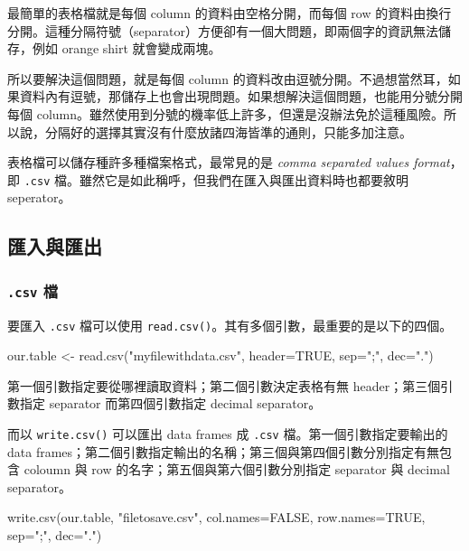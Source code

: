 \documentclass[
]{book}
\newenvironment{Shaded}{\begin{snugshade}}{\end{snugshade}}
\newcommand{\AttributeTok}[1]{\textcolor[rgb]{0.77,0.63,0.00}{#1}}
\newcommand{\ConstantTok}[1]{\textcolor[rgb]{0.00,0.00,0.00}{#1}}
\newcommand{\FunctionTok}[1]{\textcolor[rgb]{0.00,0.00,0.00}{#1}}
\newcommand{\NormalTok}[1]{#1}
\newcommand{\OtherTok}[1]{\textcolor[rgb]{0.56,0.35,0.01}{#1}}
\newcommand{\StringTok}[1]{\textcolor[rgb]{0.31,0.60,0.02}{#1}}
\theoremstyle{definition}
\theoremstyle{remark}
\begin{document}
最簡單的表格檔就是每個 column 的資料由空格分開，而每個 row 的資料由換行分開。這種分隔符號（separator）方便卻有一個大問題，即兩個字的資訊無法儲存，例如 orange shirt 就會變成兩塊。

所以要解決這個問題，就是每個 column 的資料改由逗號分開。不過想當然耳，如果資料內有逗號，那儲存上也會出現問題。如果想解決這個問題，也能用分號分開每個 column。雖然使用到分號的機率低上許多，但還是沒辦法免於這種風險。所以說，分隔好的選擇其實沒有什麼放諸四海皆準的通則，只能多加注意。

表格檔可以儲存種許多種檔案格式，最常見的是 \emph{comma separated values format}，即 \texttt{.csv} 檔。雖然它是如此稱呼，但我們在匯入與匯出資料時也都要敘明 seperator。

\hypertarget{ux532fux5165ux8207ux532fux51fa}{%
\subsection{匯入與匯出}\label{ux532fux5165ux8207ux532fux51fa}}

\hypertarget{csv-ux6a94}{%
\subsubsection{\texorpdfstring{\texttt{.csv} 檔}{.csv 檔}}\label{csv-ux6a94}}

要匯入 \texttt{.csv} 檔可以使用 \texttt{read.csv()}。其有多個引數，最重要的是以下的四個。

\begin{Shaded}
\begin{Highlighting}[]
\NormalTok{our.table }\OtherTok{\textless{}{-}} \FunctionTok{read.csv}\NormalTok{(}\StringTok{"myfilewithdata.csv"}\NormalTok{, }\AttributeTok{header=}\ConstantTok{TRUE}\NormalTok{, }\AttributeTok{sep=}\StringTok{";"}\NormalTok{, }\AttributeTok{dec=}\StringTok{"."}\NormalTok{)}
\end{Highlighting}
\end{Shaded}

第一個引數指定要從哪裡讀取資料；第二個引數決定表格有無 header；第三個引數指定 separator 而第四個引數指定 decimal separator。

而以 \texttt{write.csv()} 可以匯出 data frames 成 \texttt{.csv} 檔。第一個引數指定要輸出的 data frames；第二個引數指定輸出的名稱；第三個與第四個引數分別指定有無包含 coloumn 與 row 的名字；第五個與第六個引數分別指定 separator 與 decimal separator。

\begin{Shaded}
\begin{Highlighting}[]
\FunctionTok{write.csv}\NormalTok{(our.table, }\StringTok{"filetosave.csv"}\NormalTok{, }\AttributeTok{col.names=}\ConstantTok{FALSE}\NormalTok{, }\AttributeTok{row.names=}\ConstantTok{TRUE}\NormalTok{, }\AttributeTok{sep=}\StringTok{";"}\NormalTok{, }\AttributeTok{dec=}\StringTok{"."}\NormalTok{)}
\end{Highlighting}
\end{Shaded}
\end{document}
